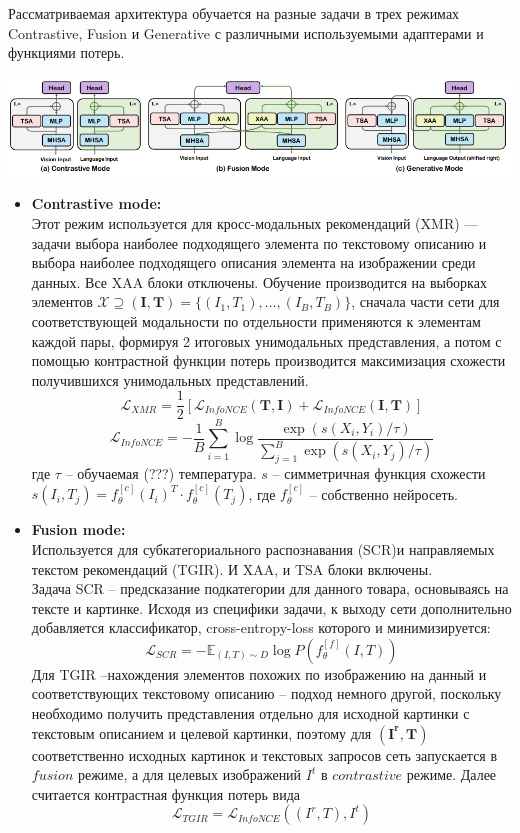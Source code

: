 \documentclass[a4paper,12pt]{article}
\begin{document}
				Рассматриваемая архитектура обучается на разные задачи в трех режимах Contrastive, Fusion и Generative с различными используемыми адаптерами и функциями потерь. 
				
				\includegraphics[scale = 0.7]{FAME-ViL_modes.png}
				
				\begin{itemize}
					\item[]\textbf{Contrastive mode:}\\
					Этот режим используется для кросс-модальных рекомендаций (XMR) --- задачи выбора наиболее подходящего элемента по текстовому описанию и выбора наиболее подходящего описания элемента на изображении среди данных. Все XAA блоки отключены. Обучение производится на выборках элементов $\mathcal{X} \supseteq (\textbf{I}, \textbf{T}) = \{(I_1, T_1), \dots, (I_B, T_B)\}$, сначала части сети для соответствующей модальности по отдельности применяются к элементам каждой пары, формируя 2 итоговых унимодальных представления, а потом с помощью контрастной функции потерь \cite{https://doi.org/10.48550/arXiv.2004.11362} производится максимизация схожести получившихся унимодальных представлений.
					$$\mathcal{L}_{XMR} = \frac{1}{2} [\mathcal{L}_{InfoNCE}(\mathbf{T}, \mathbf{I}) + \mathcal{L}_{InfoNCE}(\mathbf{I}, \mathbf{T})]$$
					$$\mathcal{L}_{InfoNCE} = -\frac{1}{B}\sum\limits_{i=1}^{B}\log\frac{\exp(s(X_i, Y_i)/\tau)}{\sum_{j=1}^B\exp(s(X_i, Y_j)/\tau)}$$
					где $\tau$ -- обучаемая (???) температура. $s$ -- симметричная функция схожести $s(I_i, T_j) = f_\theta^{[c]}(I_i)^T\cdot f_\theta^{[c]}(T_j)$, где $f_\theta^{[c]}$ -- собственно нейросеть.
					\item[]\textbf{Fusion mode:}\\
					Используется для субкатегориального распознавания (SCR)и направляемых текстом рекомендаций (TGIR). И XAA, и TSA блоки включены. \\
					Задача SCR -- предсказание подкатегории для данного товара, основываясь на тексте и картинке. Исходя из специфики задачи, к выходу сети дополнительно добавляется классификатор, cross-entropy-loss которого и минимизируется:
					$$\mathcal{L}_{SCR} = -\mathbb{E}_{(I,T)\sim D}\log P\left(f_\theta^{[f]}(I, T)\right)$$
					Для TGIR --нахождения элементов похожих по изображению на данный и соответствующих текстовому описанию -- подход немного другой, поскольку необходимо получить представления отдельно для исходной картинки с текстовым описанием и целевой картинки, поэтому для $(\mathbf{I^r}, \mathbf{T})$ соответственно исходных картинок и текстовых запросов сеть запускается в $fusion$ режиме, а для целевых изображений $I^t$ в $contrastive$ режиме. Далее считается контрастная функция потерь вида
					$$\mathcal{L}_{TGIR} = \mathcal{L}_{InfoNCE}((I^r,T), I^t)$$
					

\end{itemize}
\end{document}
